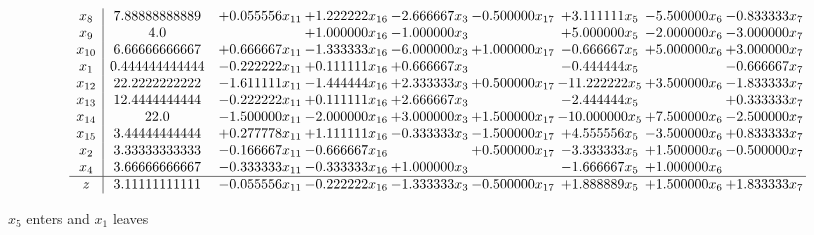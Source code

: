 \documentclass[10pt]{article}
\begin{document}
 \[\begin{array}{c| c c@{\hskip 2pt} c@{\hskip 2pt} c@{\hskip 2pt} c@{\hskip 2pt} c@{\hskip 2pt} c@{\hskip 2pt} c@{\hskip 2pt} }
 x_{8}   &  7.88888888889 & + 0.055556 x_{11} & + 1.222222 x_{16} & -2.666667 x_{3} & -0.500000 x_{17} & + 3.111111 x_{5} & -5.500000 x_{6} & -0.833333 x_{7}\\
 x_{9}   &  4.0  &   & + 1.000000 x_{16} & -1.000000 x_{3} &   & + 5.000000 x_{5} & -2.000000 x_{6} & -3.000000 x_{7}\\
 x_{10}   &  6.66666666667 & + 0.666667 x_{11} & -1.333333 x_{16} & -6.000000 x_{3} & + 1.000000 x_{17} & -0.666667 x_{5} & + 5.000000 x_{6} & + 3.000000 x_{7}\\
 x_{1}   &  0.444444444444 & -0.222222 x_{11} & + 0.111111 x_{16} & + 0.666667 x_{3} &   & -0.444444 x_{5} &   & -0.666667 x_{7}\\
 x_{12}   &  22.2222222222 & -1.611111 x_{11} & -1.444444 x_{16} & + 2.333333 x_{3} & + 0.500000 x_{17} & -11.222222 x_{5} & + 3.500000 x_{6} & -1.833333 x_{7}\\
 x_{13}   &  12.4444444444 & -0.222222 x_{11} & + 0.111111 x_{16} & + 2.666667 x_{3} &   & -2.444444 x_{5} &   & + 0.333333 x_{7}\\
 x_{14}   &  22.0 & -1.500000 x_{11} & -2.000000 x_{16} & + 3.000000 x_{3} & + 1.500000 x_{17} & -10.000000 x_{5} & + 7.500000 x_{6} & -2.500000 x_{7}\\
 x_{15}   &  3.44444444444 & + 0.277778 x_{11} & + 1.111111 x_{16} & -0.333333 x_{3} & -1.500000 x_{17} & + 4.555556 x_{5} & -3.500000 x_{6} & + 0.833333 x_{7}\\
 x_{2}   &  3.33333333333 & -0.166667 x_{11} & -0.666667 x_{16} &   & + 0.500000 x_{17} & -3.333333 x_{5} & + 1.500000 x_{6} & -0.500000 x_{7}\\
 x_{4}   &  3.66666666667 & -0.333333 x_{11} & -0.333333 x_{16} & + 1.000000 x_{3} &   & -1.666667 x_{5} & + 1.000000 x_{6} &   \\
\hline
z    &  3.11111111111 & -0.055556 x_{11} & -0.222222 x_{16} & -1.333333 x_{3} & -0.500000 x_{17} & + 1.888889 x_{5} & + 1.500000 x_{6} & + 1.833333 x_{7}\\
\end{array}\]


 $ x_{5} $ enters and $ x_{1} $ leaves 
\end{document}
